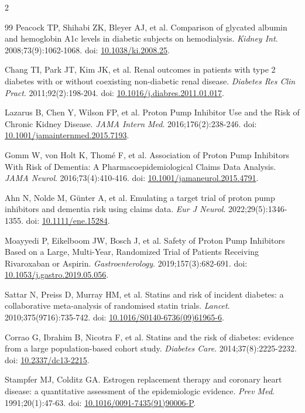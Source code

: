 \documentclass[10pt,letterpaper]{article}
\begin{document}
\begin{multicols}{2}
\begin{thebibliography}{99}
 Peacock TP, Shihabi ZK, Bleyer AJ, et al. Comparison of glycated albumin and hemoglobin A1c levels in diabetic subjects on hemodialysis. \textit{Kidney Int}. 2008;73(9):1062-1068. doi: \href{https://doi.org/10.1038/ki.2008.25}{10.1038/ki.2008.25}.

 Chang TI, Park JT, Kim JK, et al. Renal outcomes in patients with type 2 diabetes with or without coexisting non-diabetic renal disease. \textit{Diabetes Res Clin Pract}. 2011;92(2):198-204. doi: \href{https://doi.org/10.1016/j.diabres.2011.01.017}{10.1016/j.diabres.2011.01.017}.

 Lazarus B, Chen Y, Wilson FP, et al. Proton Pump Inhibitor Use and the Risk of Chronic Kidney Disease. \textit{JAMA Intern Med}. 2016;176(2):238-246. doi: \href{https://doi.org/10.1001/jamainternmed.2015.7193}{10.1001/jamainternmed.2015.7193}.

 Gomm W, von Holt K, Thomé F, et al. Association of Proton Pump Inhibitors With Risk of Dementia: A Pharmacoepidemiological Claims Data Analysis. \textit{JAMA Neurol}. 2016;73(4):410-416. doi: \href{https://doi.org/10.1001/jamaneurol.2015.4791}{10.1001/jamaneurol.2015.4791}.

 Ahn N, Nolde M, Günter A, et al. Emulating a target trial of proton pump inhibitors and dementia risk using claims data. \textit{Eur J Neurol}. 2022;29(5):1346-1355. doi: \href{https://doi.org/10.1111/ene.15284}{10.1111/ene.15284}.

 Moayyedi P, Eikelboom JW, Bosch J, et al. Safety of Proton Pump Inhibitors Based on a Large, Multi-Year, Randomized Trial of Patients Receiving Rivaroxaban or Aspirin. \textit{Gastroenterology}. 2019;157(3):682-691. doi: \href{https://doi.org/10.1053/j.gastro.2019.05.056}{10.1053/j.gastro.2019.05.056}.

 Sattar N, Preiss D, Murray HM, et al. Statins and risk of incident diabetes: a collaborative meta-analysis of randomised statin trials. \textit{Lancet}. 2010;375(9716):735-742. doi: \href{https://doi.org/10.1016/S0140-6736(09)61965-6}{10.1016/S0140-6736(09)61965-6}.

 Corrao G, Ibrahim B, Nicotra F, et al. Statins and the risk of diabetes: evidence from a large population-based cohort study. \textit{Diabetes Care}. 2014;37(8):2225-2232. doi: \href{https://doi.org/10.2337/dc13-2215}{10.2337/dc13-2215}.

 Stampfer MJ, Colditz GA. Estrogen replacement therapy and coronary heart disease: a quantitative assessment of the epidemiologic evidence. \textit{Prev Med}. 1991;20(1):47-63. doi: \href{https://doi.org/10.1016/0091-7435(91)90006-P}{10.1016/0091-7435(91)90006-P}.


\end{thebibliography}
\end{multicols}
\end{document}
